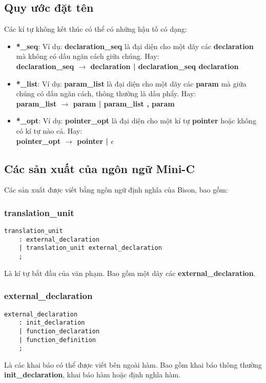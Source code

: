 \documentclass[../report.tex]{subfiles}
\begin{document}
\subsection{Quy ước đặt tên}
Các kí tự không kết thúc có thể có những hậu tố có dạng:
\begin{itemize}
\item \textbf{*\_seq}: Ví dụ: \textbf{declaration\_seq} là đại diện 
cho một dãy 
các \textbf{declaration} mà không có dấu ngăn cách giữa chúng. 
Hay: \\
\tab \textbf{declaration\_seq $\rightarrow$ declaration | 
    declaration\_seq declaration}

\item \textbf{*\_list}: Ví dụ: \textbf{param\_list} là đại diện cho 
một dãy 
các \textbf{param} mà giữa chúng có dấu ngăn cách, thông thường là 
dấu phẩy. Hay: \\
\tab \textbf{param\_list $\rightarrow$ param | param\_list , param}

\item \textbf{*\_opt}:  Ví dụ: \textbf{pointer\_opt} là đại diện 
cho một kí tự \textbf{pointer} hoặc không có kí tự nào cả. Hay: \\
\tab \textbf{pointer\_opt $\rightarrow$ pointer | $\epsilon$}
\end{itemize}

\subsection{Các sản xuất của ngôn ngữ Mini-C}
Các sản xuất được viết bằng ngôn ngữ định nghĩa của Bison, bao gồm:
\subsubsection{translation\_unit}
\begin{lstlisting}
translation_unit
    : external_declaration
    | translation_unit external_declaration
    ;
\end{lstlisting}
Là kí tự bắt đầu của văn phạm. Bao gồm một dãy các 
\textbf{external\_declaration}. \\

\subsubsection{external\_declaration}
\begin{lstlisting}
external_declaration
    : init_declaration
    | function_declaration
    | function_definition
    ;
\end{lstlisting}
Là các khai báo có thể được viết bên ngoài hàm. Bao gồm 
khai báo thông thường \textbf{init\_declaration}, khai báo 
hàm hoặc định nghĩa hàm. \\
\end{document}
